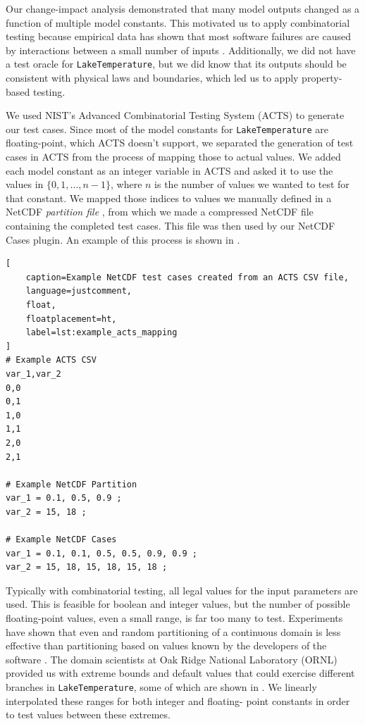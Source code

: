\documentclass[10pt,twocolumn]{article}
\newcommand{\term}[1]{%
    \emph{#1}%
}
\begin{document}
Our change-impact analysis demonstrated that many model outputs changed as a function of
multiple model constants. This motivated us to apply combinatorial testing because 
empirical data has shown that most software failures are caused by interactions between a 
small number of inputs \cite{combinatorial-emperical}. Additionally, we did not have a
test oracle for \verb|LakeTemperature|, but we did know that its outputs should be  
consistent with physical laws and boundaries, which led us to apply property-based 
testing. 

We used NIST's Advanced Combinatorial Testing System (ACTS) \cite{acts} to generate our 
test cases. Since
most of the model constants for \verb|LakeTemperature| are floating-point, which
ACTS doesn't support,  
we separated the generation of test cases in
ACTS from the process of mapping those to actual values. We added each model 
constant as an integer variable in ACTS and asked it to use the values in $\{0, 1, \dots, 
n - 1\}$, where $n$ is the number of values we wanted to test for that 
constant. We mapped those indices to values we manually defined in a NetCDF 
\term{partition file}, from which we made a compressed NetCDF file containing 
the completed test cases. This file was then used by our NetCDF Cases plugin. An 
example of this process is shown in .

\begin{lstlisting}[
    caption=Example NetCDF test cases created from an ACTS CSV file,
    language=justcomment,
    float,
    floatplacement=ht,
    label=lst:example_acts_mapping
]
# Example ACTS CSV
var_1,var_2
0,0
0,1
1,0
1,1
2,0
2,1

# Example NetCDF Partition
var_1 = 0.1, 0.5, 0.9 ;
var_2 = 15, 18 ;

# Example NetCDF Cases
var_1 = 0.1, 0.1, 0.5, 0.5, 0.9, 0.9 ;
var_2 = 15, 18, 15, 18, 15, 18 ;
\end{lstlisting}

Typically with combinatorial testing, all legal values for the input parameters are
used. This is feasible for boolean and integer values, but the number of possible 
floating-point values, even a small range, is far too many to test. Experiments
have shown that even and random partitioning of a continuous domain is less effective than 
partitioning based on values known by the developers of the software
\cite{combinatorial-continuous}. The domain scientists at Oak Ridge National Laboratory 
(ORNL) provided us with extreme bounds and default values that could exercise different 
branches in \verb|LakeTemperature|, some of which are shown in 
\cite{peter-and-dali}. We linearly interpolated these ranges for both integer and floating-
point constants in order to test values between these extremes.
\end{document}
